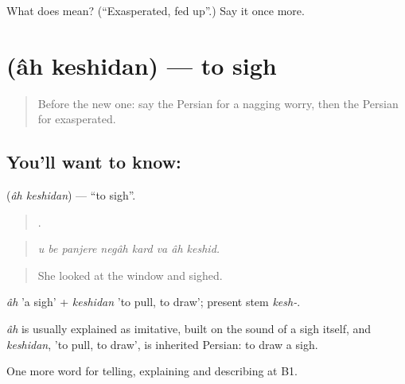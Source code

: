 \begin{tcolorbox}[breakable,colback=teal!4,colframe=teal!35!black,title={Before you move on}]
What does  mean? (\textquotedblleft{}Exasperated, fed up\textquotedblright{}.) Say it once more.
\end{tcolorbox}
\section[\texorpdfstring{\fa{آه} \fa{کشیدن} (âh keshidan)}{آه کشیدن (âh keshidan)}]{  (âh keshidan) — to sigh}

\label{lesson:FA-C485-ah-keshidan}



\begin{quote}
Before the new one: say the Persian for a nagging worry, then the Persian for exasperated.
\end{quote}

\subsection*{You'll want to know:  }
\textbf{ } (\emph{âh keshidan}) — \textquotedblleft{}to sigh\textquotedblright{}.

\begin{quote}
       .
\end{quote}

\begin{quote}
\emph{u be panjere negâh kard va âh keshid.}
\end{quote}

\begin{quote}
She looked at the window and sighed.
\end{quote}

\emph{âh} 'a sigh' + \emph{keshidan} 'to pull, to draw'; present stem \emph{kesh-}.

\begin{cousinweb}
\emph{âh} is usually explained as imitative, built on the sound of a sigh itself, and \emph{keshidan}, 'to pull, to draw', is inherited Persian: to draw a sigh.
\end{cousinweb}

\begin{grammarlens}[title={What you've built}]
One more word for telling, explaining and describing at B1.
\end{grammarlens}

